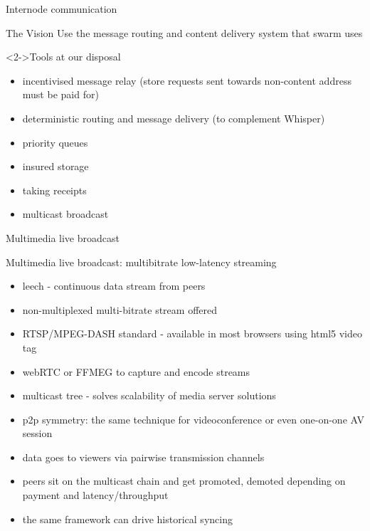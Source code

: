 \begin{subsection}{Internode communication}
\begin{frame}
 \begin{block}{The Vision}
Use the message routing and content delivery system that swarm uses
 \end{block}
 \begin{block}<2->{Tools at our disposal}
  \begin{itemize}
   \item incentivised message relay (store requests sent towards non-content address must be paid for)
   \item deterministic routing and message delivery (to complement Whisper)
   \item priority queues
   \item insured storage
   \item taking receipts
   \item multicast broadcast
  \end{itemize}
 \end{block}
\end{frame}


\end{subsection}

\begin{subsection}{Multimedia live broadcast}


\begin{frame}{}
\begin{block}{Multimedia live broadcast: multibitrate low-latency streaming}
 \begin{itemize}
    \item leech - continuous data stream from peers
    \item non-multiplexed multi-bitrate stream offered
    \item RTSP/MPEG-DASH standard - available in most browsers using html5 video tag
    \item webRTC or FFMEG to capture and encode streams
    \item multicast tree - solves scalability of media server solutions
    \item p2p symmetry: the same technique for videoconference or even one-on-one AV session
    \item data goes to viewers via pairwise transmission channels
    \item peers sit on the multicast chain and get  promoted, demoted depending on payment and latency/throughput
    \item the same framework can drive historical syncing
\end{itemize}
\end{block}
\end{frame}


\end{subsection}

